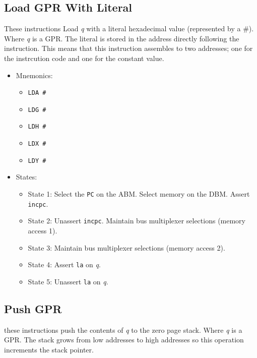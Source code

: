 \documentclass[a4paper,12pt]{article}
\newcommand{\PC}{\texttt{PC}}
\newcommand{\qq}{\textit{q}}
\begin{document}
\subsection{Load GPR With Literal}
These instructions Load \qq{} with a literal hexadecimal value (represented by
a \#). Where \qq{} is a GPR. The literal is stored in the address directly 
following the instruction. This means that this instruction assembles to two
addresses; one for the instrcution code and one for the constant value.
\par

\begin{itemize}
\item Mnemonics:
\begin{itemize}
	\item \texttt{LDA \#}
	\item \texttt{LDG \#}
	\item \texttt{LDH \#}
	\item \texttt{LDX \#}
	\item \texttt{LDY \#}
\end{itemize}
\item States:
\begin{itemize}
	\item State 1: Select the \PC{} on the ABM. Select memory on the DBM.
	Assert \texttt{incpc}.
	\item State 2: Unassert \texttt{incpc}. Maintain bus multiplexer
	selections (memory access 1).
	\item State 3: Maintain bus multiplexer selections (memory access 2).
	\item State 4: Assert \texttt{la} on \qq{}.
	\item State 5: Unassert \texttt{la} on \qq{}.
\end{itemize}
\end{itemize}

\subsection{Push GPR}
these instructions push the contents of \qq{} to the zero page stack. Where
\qq{} is a GPR. The stack grows from low addresses to high addresses so this
operation increments the stack pointer.
\par
\end{document}
